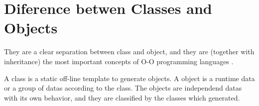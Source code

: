\section{Diference betwen Classes and Objects}

They are a clear separation between 
class and object, 
and they are (together with inheritance) 
the most important concepts of O-O programming 
languages \cite{Dahl:1970}. 

A class is a static off-line 
template to generate objects. 
A object is a runtime data 
or a group of datas 
according to the class. The objects are 
independend datas with 
its own behavior, and 
they are classified by the classes 
which generated.

